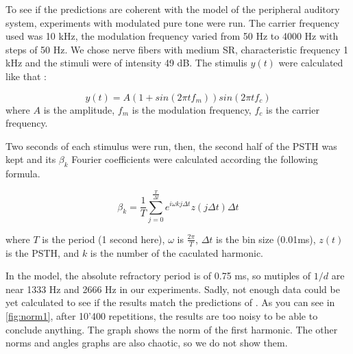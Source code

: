 To see if the predictions are coherent with the model of the peripheral auditory 
system, experiments with modulated pure tone were run. 
The carrier frequency used was 10 kHz, the modulation frequency varied from 50 Hz to 4000 Hz
with steps of 50 Hz. We chose nerve fibers with medium SR, characteristic frequency 1 kHz 
and the stimuli were of intensity 49 dB.
The stimulis $y\left(t\right)$ were calculated like that :

\begin{equation}\label{freqstim} y\left(t\right) = A \left(1+sin \left(2 \pi t f_m \right)\right) sin \left(2 \pi t f_c \right)\end{equation} %
where $A$ is the amplitude,
$f_m$ is the modulation frequency,
$f_c$ is the carrier frequency.

 
Two seconds of each stimulus were run, 
then, the second half of the PSTH was kept and its $\beta_k$ Fourier coefficients were calculated according the following formula.

\begin{equation}\label{bkformula} \beta_k = \frac{1}{T} \sum_{j= 0}^{\frac{T}{\Delta t}} e^{i \omega k j \Delta t} z \left( j \Delta t\right)\Delta t\end{equation}

where $T$ is the period (1 second here), %
 $\omega$ is $\frac{2\pi}{T}$,
$\Delta t$ is the bin size (0.01ms),
$z\left(t\right)$ is the PSTH,
and $k$ is the number of the caculated harmonic.

In the model, the absolute refractory period is of 0.75 ms, so mutiples of $1/d$ are near 1333 Hz and 2666 Hz in our experiments.
Sadly, not enough data could be yet calculated to see if the results match the predictions of 
\cite{Deger}. 
As you can see in \autoref{fig:norm1}, after 10'400 repetitions, the results are too noisy to be able to conclude anything. %
The graph shows the norm of the first harmonic. The other norms and angles graphs are also chaotic, so we do not show them.












 